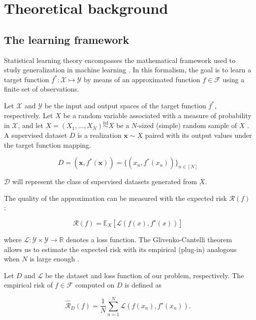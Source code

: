 \chapter{Theoretical background }\label{sec:theory}

\section{The learning framework}

Statistical learning theory encompasses the mathematical framework used to
study generalization in machine learning
\cite{n.vapnikNatureStatisticalLearning2000}.
In this formalism, the goal
is to learn a target function $f^*: \mathcal{X} \longmapsto \mathcal{Y}$ 
by means of an approximated function $f \in \mathcal{F}$ using a 
finite set of observations. 

\begin{definition}\label{def:dataset}
    Let $\mathcal{X}$ and $\mathcal{Y}$ be
    the input and output spaces of the target function $f^*$, respectively. Let $X$ 
    be a random variable associated with a measure of probability in $\mathcal{X}$, 
    and let $\underbar{X} = (X_1, ..., X_N) \overset{\text{iid}}{\sim} X$ be a $N$-sized (simple)
    random sample of $X$ 
    \cite{casellaStatisticalInference2002}.
    A supervised dataset $D$ is a realization
     $\bm{x} \sim \underbar{X}$ paired with its output values under the 
     target function mapping.

    $$
    D = (\bm{x}, f^*(\bm{x})) = \{(x_n, f^*(x_n))\}_{n \in [N]}
    $$

    $\mathcal{D}$ will represent the class of supervised datasets generated from $\underbar{X}$.
\end{definition}

The quality of the approximation can be measured with the expected risk $\mathcal{R}(f)$:

$$
\mathcal{R}(f)=\mathbb{E}_{X} [\mathcal{L}(f(x),f^\star(x))]
$$

where $\mathcal{L}: \mathcal{Y} \times \mathcal{Y} \to \mathbb{R}$ denotes a loss function. 
The Glivenko-Cantelli theorem allows us to estimate the expected risk 
with its empirical (plug-in) analogous when $N$ is large 
enough \cite{gutIntermediateCourseProbability2009}.

\begin{definition}\label{def:erm}
    Let $D$ and $\mathcal{L}$ be the dataset and loss function of our problem, respectively. 
    The empirical risk of $f \in \mathcal{F}$ computed on $D$ is defined as

    $$
    \hat{\mathcal{R}}_D(f)=\frac{1}{N}\sum_{n=1}^{N}\mathcal{L}(f(x_{n}),f^{\star}(x_{n})).
    $$
\end{definition}

